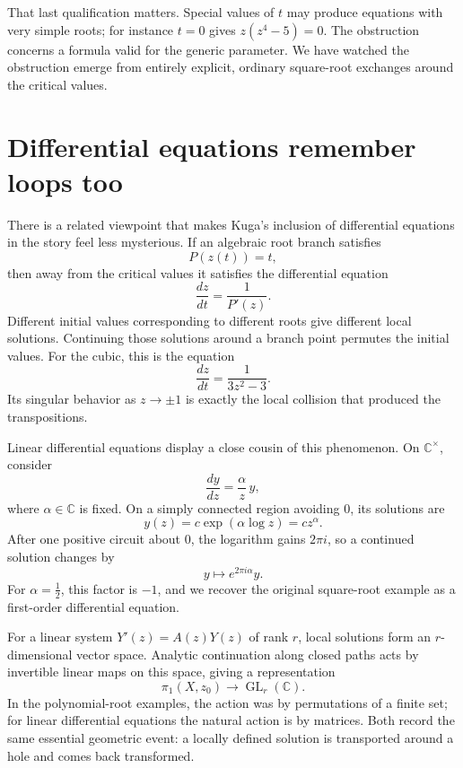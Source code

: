 That last qualification matters. Special values of \(t\) may produce equations with very simple roots; for instance \(t=0\) gives \(z(z^4-5)=0\). The obstruction concerns a formula valid for the generic parameter. We have watched the obstruction emerge from entirely explicit, ordinary square-root exchanges around the critical values.

\section{Differential equations remember loops too}

There is a related viewpoint that makes Kuga's inclusion of differential equations in the story feel less mysterious. If an algebraic root branch satisfies
\[
 P(z(t))=t,
\]
then away from the critical values it satisfies the differential equation
\[
 \frac{dz}{dt}=\frac1{P'(z)}.
\]
Different initial values corresponding to different roots give different local solutions. Continuing those solutions around a branch point permutes the initial values. For the cubic, this is the equation
\[
 \frac{dz}{dt}=\frac1{3z^2-3}.
\]
Its singular behavior as \(z\to\pm1\) is exactly the local collision that produced the transpositions.

Linear differential equations display a close cousin of this phenomenon. On \(\mathbb C^\times\), consider
\begin{equation}
 \frac{dy}{dz}=\frac{\alpha}{z}\,y,
 \label{eq:N20261030-linearODE}
\end{equation}
where \(\alpha\in\mathbb C\) is fixed. On a simply connected region avoiding \(0\), its solutions are
\[
 y(z)=c\exp(\alpha\log z)=cz^\alpha.
\]
After one positive circuit about \(0\), the logarithm gains \(2\pi i\), so a continued solution changes by
\[
 y\longmapsto e^{2\pi i\alpha}y.
\]
For \(\alpha=\frac12\), this factor is \(-1\), and we recover the original square-root example as a first-order differential equation.

For a linear system \(Y'(z)=A(z)Y(z)\) of rank \(r\), local solutions form an \(r\)-dimensional vector space. Analytic continuation along closed paths acts by invertible linear maps on this space, giving a representation
\[
 \pi_1(X,z_0)\longrightarrow\operatorname{GL}_r(\mathbb C).
\]
In the polynomial-root examples, the action was by permutations of a finite set; for linear differential equations the natural action is by matrices. Both record the same essential geometric event: a locally defined solution is transported around a hole and comes back transformed.
